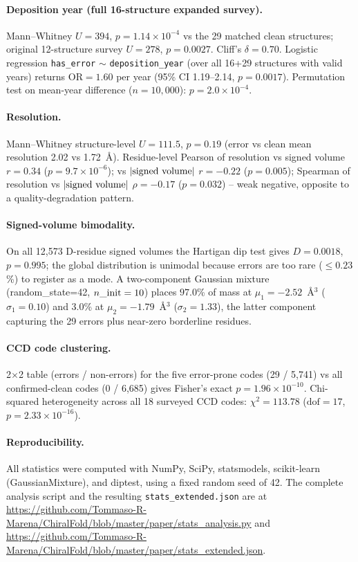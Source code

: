 \documentclass[11pt]{article}
\begin{document}
\paragraph{Deposition year (full 16-structure expanded survey).} Mann--Whitney $U=394$, $p=1.14\times10^{-4}$ vs the 29 matched clean structures; original 12-structure survey $U=278$, $p=0.0027$. Cliff's $\delta=0.70$. Logistic regression \texttt{has\_error} $\sim$ \texttt{deposition\_year} (over all 16+29 structures with valid years) returns $\mathrm{OR}=1.60$ per year (95\% CI 1.19--2.14, $p=0.0017$). Permutation test on mean-year difference ($n=10{,}000$): $p=2.0\times10^{-4}$.

\paragraph{Resolution.} Mann--Whitney structure-level $U=111.5$, $p=0.19$ (error vs clean mean resolution 2.02 vs 1.72~\AA). Residue-level Pearson of resolution vs signed volume $r=0.34$ ($p=9.7\times10^{-6}$); vs $|\textnormal{signed volume}|$ $r=-0.22$ ($p=0.005$); Spearman of resolution vs $|\textnormal{signed volume}|$ $\rho=-0.17$ ($p=0.032$) -- weak negative, opposite to a quality-degradation pattern.

\paragraph{Signed-volume bimodality.} On all 12{,}573 D-residue signed volumes the Hartigan dip test gives $D=0.0018$, $p=0.995$; the global distribution is unimodal because errors are too rare ($\le0.23$\%) to register as a mode. A two-component Gaussian mixture (random\_state=42, $n\_\textnormal{init}=10$) places $97.0$\% of mass at $\mu_1=-2.52$~\AA$^3$ ($\sigma_1=0.10$) and $3.0$\% at $\mu_2=-1.79$~\AA$^3$ ($\sigma_2=1.33$), the latter component capturing the 29 errors plus near-zero borderline residues.

\paragraph{CCD code clustering.} 2$\times$2 table (errors / non-errors) for the five error-prone codes (29 / 5{,}741) vs all confirmed-clean codes (0 / 6{,}685) gives Fisher's exact $p=1.96\times10^{-10}$. Chi-squared heterogeneity across all 18 surveyed CCD codes: $\chi^2=113.78$ ($\mathrm{dof}=17$, $p=2.33\times10^{-16}$).

\paragraph{Reproducibility.} All statistics were computed with NumPy, SciPy, statsmodels, scikit-learn (GaussianMixture), and diptest, using a fixed random seed of 42. The complete analysis script and the resulting \texttt{stats\_extended.json} are at \url{https://github.com/Tommaso-R-Marena/ChiralFold/blob/master/paper/stats_analysis.py} and \url{https://github.com/Tommaso-R-Marena/ChiralFold/blob/master/paper/stats_extended.json}.
\end{document}
